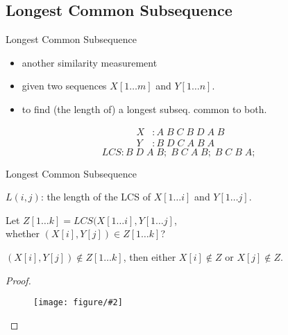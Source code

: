 \documentclass{beamer}
\newcommand{\fig}[2]
{
  \begin{figure}[htp]
	  \centering
	  \texttt{[image: figure/\#2]}
  \end{figure}
}
\begin{document}
\subsection{Longest Common Subsequence}
  
\begin{frame}{Longest Common Subsequence}
  \begin{problem}
    \begin{itemize}
      \item another similarity measurement
      \item given two sequences $X[1 \ldots m]$ and $Y[1 \ldots n]$.
      \item to find (the length of) a longest subseq. common to both.
    \end{itemize} 
    \vspace{0.50cm}
    \begin{mdframed}[leftmargin = 1.5cm, rightmargin = 1.5cm]
      \begin{align*}
        X &: A \; B \; C \; B \; D \; A \; B \\
        Y &: B \; D \; C \; A \; B \; A
      \end{align*}
      \[
        LCS: B \; D \; A\; B; \; B\; C\; A\; B; \; B\; C\; B\; A; \;
      \]
    \end{mdframed}
  \end{problem}
\end{frame}
\begin{frame}{Longest Common Subsequence}
  \begin{mdframed}[rightmargin = 0.5cm]
    $L(i,j)$: the length of the LCS of $X[1 \ldots i]$ and $Y[1 \ldots j]$.
  \end{mdframed}
  
  \vspace{0.50cm}
   Let $Z[1 \ldots k] = LCS(X[1 \ldots i], Y[1 \ldots j]$, \\
    whether $(X[i], Y[j]) \in Z[1 \ldots k]$?
  \begin{lemma}
     $(X[i],Y[j]) \notin Z[1 \ldots k]$, then either $X[i] \notin Z$ or
    $X[j] \notin Z$.
  \end{lemma}
  
  \pause
  \begin{proof}
    \fig{width = 0.50\textwidth}{lcschoice}
  \end{proof}
\end{frame}
\end{document}
